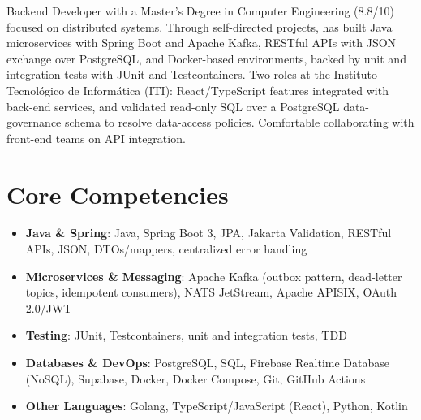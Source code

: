 \documentclass[11pt,a4paper,sans]{moderncv}
\begin{document}
\makecvtitle


\vspace{6pt}
\small{Backend Developer with a Master's Degree in Computer Engineering (8.8/10) focused on distributed systems. Through self-directed projects, has built Java microservices with Spring Boot and Apache Kafka, RESTful APIs with JSON exchange over PostgreSQL, and Docker-based environments, backed by unit and integration tests with JUnit and Testcontainers. Two roles at the Instituto Tecnológico de Informática (ITI): React/TypeScript features integrated with back-end services, and validated read-only SQL over a PostgreSQL data-governance schema to resolve data-access policies. Comfortable collaborating with front-end teams on API integration.}


\section{Core Competencies}
\vspace{1pt}
\begin{itemize}

\item \textbf{Java \& Spring}: Java, Spring Boot 3, JPA, Jakarta Validation, RESTful APIs, JSON, DTOs/mappers, centralized error handling

\item \textbf{Microservices \& Messaging}: Apache Kafka (outbox pattern, dead-letter topics, idempotent consumers), NATS JetStream, Apache APISIX, OAuth 2.0/JWT

\item \textbf{Testing}: JUnit, Testcontainers, unit and integration tests, TDD

\item \textbf{Databases \& DevOps}: PostgreSQL, SQL, Firebase Realtime Database (NoSQL), Supabase, Docker, Docker Compose, Git, GitHub Actions

\item \textbf{Other Languages}: Golang, TypeScript/JavaScript (React), Python, Kotlin

\end{itemize}
\end{document}
